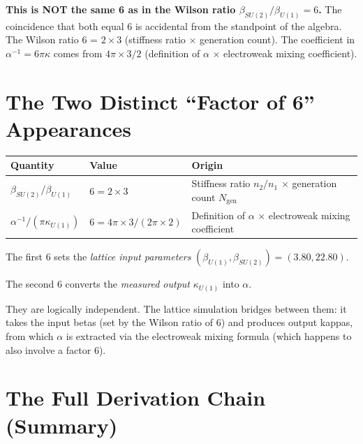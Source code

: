 \documentclass[11pt]{article}
\begin{document}
\textbf{This is NOT the same 6 as in the Wilson ratio
$\beta_{SU(2)}/\beta_{U(1)} = 6$.}
The coincidence that both equal 6 is accidental from the standpoint of
the algebra.  The Wilson ratio 6 = $2 \times 3$ (stiffness ratio
$\times$ generation count).  The coefficient in
$\alpha^{-1} = 6\pi\kappa$ comes from $4\pi \times 3/2$
(definition of $\alpha$ $\times$ electroweak mixing coefficient).


\section{The Two Distinct ``Factor of 6'' Appearances}

\begin{center}
\renewcommand{\arraystretch}{1.4}
\begin{tabular}{lll}
\toprule
\textbf{Quantity} & \textbf{Value} & \textbf{Origin} \\
\midrule
$\beta_{SU(2)}/\beta_{U(1)}$ & $6 = 2 \times 3$
  & Stiffness ratio $n_2/n_1$ $\times$ generation count $N_{\mathrm{gen}}$ \\
$\alpha^{-1}/(\pi\kappa_{U(1)})$ & $6 = 4\pi \times 3/(2\pi \times 2)$
  & Definition of $\alpha$ $\times$ electroweak mixing coefficient \\
\bottomrule
\end{tabular}
\end{center}

The first 6 sets the \emph{lattice input parameters}
$(\beta_{U(1)}, \beta_{SU(2)}) = (3.80, 22.80)$.

The second 6 converts the \emph{measured output} $\kappa_{U(1)}$
into $\alpha$.

They are logically independent.  The lattice simulation bridges between
them: it takes the input betas (set by the Wilson ratio of 6) and
produces output kappas, from which $\alpha$ is extracted via the
electroweak mixing formula (which happens to also involve a factor 6).

\section{The Full Derivation Chain (Summary)}
\end{document}
